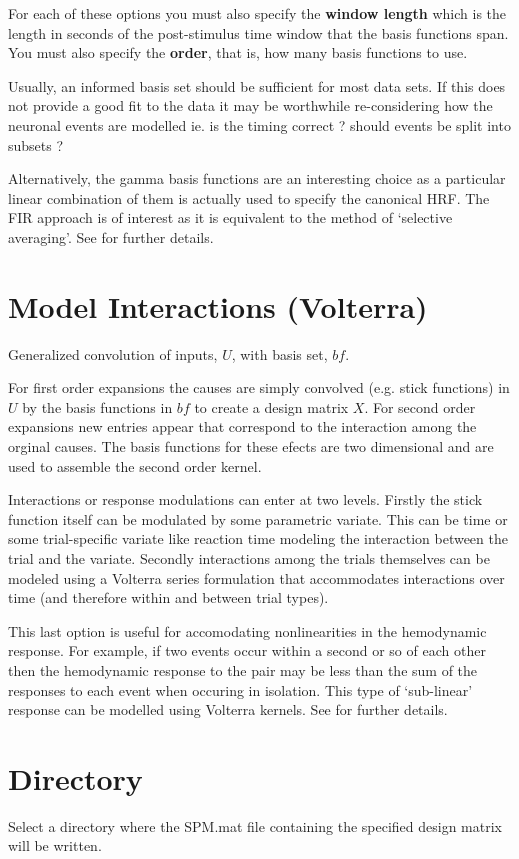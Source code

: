 \documentclass[a4paper,titlepage]{book}
\begin{document}
For each of these options you must also specify the 
{\bf window length} which is the length in seconds of the 
post-stimulus time window that the basis functions 
span. You must also specify the {\bf order}, that is, how many
basis functions to use.

Usually, an informed basis set should be sufficient for 
most data sets. If this does not provide a good fit to the 
data it may be worthwhile re-considering how the neuronal events
are modelled ie. is the timing correct ? should events be split into 
subsets ? 

Alternatively, the gamma basis functions are an interesting choice 
as a particular linear combination of them is actually used to 
specify the canonical HRF. The FIR approach is of interest as it 
is equivalent to the method of `selective averaging'. See 
\cite{rnah_conv} for further details. 

\section{Model Interactions (Volterra)}
Generalized convolution of inputs, $U$, with basis set, $bf$.

For first order expansions the causes are simply convolved (e.g. stick functions) in $U$ by the basis functions in $bf$ to create a design matrix $X$.  For second order expansions new entries appear that correspond to the interaction among the orginal causes. The basis functions for these efects are two dimensional and are used to assemble the second order kernel. 

Interactions or response modulations can enter at two levels.  Firstly the stick function itself can be modulated by some parametric variate. This can be time or some trial-specific variate like reaction time modeling the interaction between the trial and the variate. Secondly interactions among the trials themselves can be modeled using a Volterra series formulation that accommodates interactions over time (and therefore within and between trial types). 

This last option is useful 
for accomodating nonlinearities in the hemodynamic response. For 
example, if two events occur within a 
second or so of each other then the hemodynamic response to 
the pair may be less than the sum of the responses to each event when occuring in isolation. This type of `sub-linear' response can be modelled using
Volterra kernels. See \cite{balloon} for further details.

\section{Directory}
Select a directory where the SPM.mat file containing the specified design matrix will be written.
\end{document}
